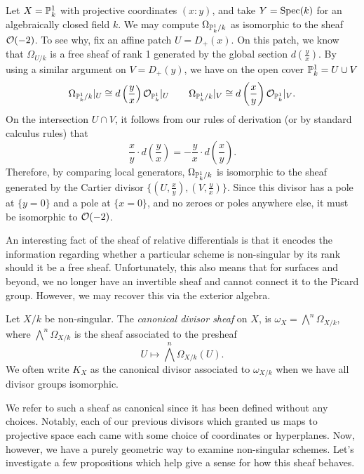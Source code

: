 \begin{example}
    Let $X = \mathbb{P}^1_k$ with projective coordinates $(x : y)$,
    and take $Y = {\rm Spec}(k)$ for an algebraically closed field $k$.
    We may compute $\Omega_{\mathbb{P}^1_k/k}$ as isomorphic to the sheaf $\mathcal{O}(-2)$.
    To see why, fix an affine patch $U = D_+(x)$.
    On this patch, we know that $\Omega_{U/k}$ is a free sheaf of rank 1 generated by the global section $d\left( \frac{y}{x} \right)$.
    By using a similar argument on $V = D_+(y)$, 
    we have on the open cover $\mathbb{P}^1_k = U \cup V$
    \[
        \Omega_{\mathbb{P}^1_k/k}|_{U} \cong d\left( \frac{y}{x} \right) \mathcal{O}_{\mathbb{P}^1_k}|_{U} \qquad
        \Omega_{\mathbb{P}^1_k/k}|_{V} \cong d\left( \frac{x}{y} \right) \mathcal{O}_{\mathbb{P}^1_k}|_{V}.
    \]
    On the intersection $U \cap V$, it follows from our rules of derivation (or by standard calculus rules) that
    \[
        \frac{x}{y} \cdot d\left( \frac{y}{x} \right)
        = - \frac{y}{x} \cdot d\left( \frac{x}{y} \right).
    \]
    Therefore, by comparing local generators,
    $\Omega_{\mathbb{P}^1_k/k}$ is isomorphic to the sheaf generated by the Cartier divisor $\{(U, \frac{x}{y}), (V, \frac{y}{x})\}$.
    Since this divisor has a pole at $\{y = 0\}$ and a pole at $\{x = 0\}$,
    and no zeroes or poles anywhere else,
    it must be isomorphic to $\mathcal{O}(-2)$.
\end{example}

An interesting fact of the sheaf of relative differentials is that it encodes the information regarding whether a particular scheme is non-singular by its rank should it be a free sheaf.
Unfortunately, this also means that for surfaces and beyond,
we no longer have an invertible sheaf and cannot connect it to the Picard group.
However, we may recover this via the exterior algebra.

\begin{definition}
    Let $X/k$ be non-singular.
    The \textit{canonical divisor sheaf} on $X$, is $\omega_X = \bigwedge^n \Omega_{X/k}$,
    where $\bigwedge^n \Omega_{X/k}$ is the sheaf associated to the presheaf
    \[
        U \mapsto \bigwedge^n \Omega_{X/k}(U).
    \]
    We often write $K_X$ as the canonical divisor associated to $\omega_{X/k}$ when we have all divisor groups isomorphic.
\end{definition}

We refer to such a sheaf as canonical since it has been defined without any choices.
Notably, each of our previous divisors which granted us maps to projective space each came with some choice of coordinates or hyperplanes.
Now, however, we have a purely geometric way to examine non-singular schemes.
Let's investigate a few propositions which help give a sense for how this sheaf behaves.

